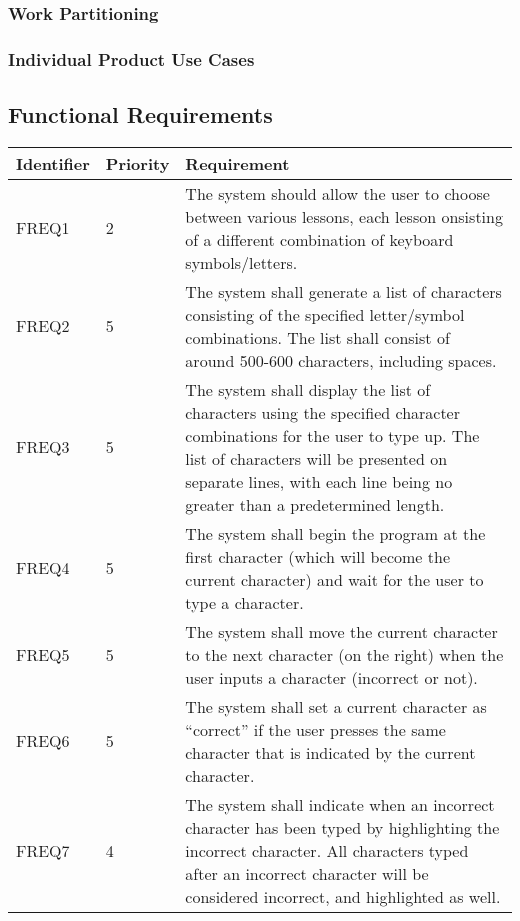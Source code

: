 \documentclass[12pt, titlepage]{article}
\begin{document}
\subsubsection{Work Partitioning}

\subsubsection{Individual Product Use Cases}

\subsection{Functional Requirements}



\begin{center}
\begin{longtable}{ |m{2cm}|m{1.8cm}|m{9.4cm}| } 
    \hline
    \textbf{Identifier} & \textbf{Priority} & \textbf{Requirement} \\ 
    \hline
    FREQ1 & 2 & The system should allow the user to choose between various lessons, each lesson onsisting of a different combination of keyboard symbols/letters. \\ 
    \hline
    FREQ2 & 5 & The system shall generate a list of characters consisting of the specified letter/symbol combinations. The list shall consist of around 500-600 characters, including spaces. \\ 
    \hline
    FREQ3 & 5 & The system shall display the list of characters using the specified character combinations for the user to type up. The list of characters will be presented on separate lines, with each line being no greater than a predetermined length.  \\ 
    \hline
    FREQ4 & 5 & The system shall begin the program at the first character (which will become the current character) and wait for the user to type a character. \\ 
    \hline
    FREQ5 & 5 & The system shall move the current character to the next character (on the right) when the user inputs a character (incorrect or not).  \\ 
    \hline
    FREQ6 & 5 & The system shall set a current character as “correct” if the user presses the same character that is indicated by the current character. \\ 
    \hline
    FREQ7 & 4 & The system shall indicate when an incorrect character has been typed by highlighting the incorrect character. All characters typed after an incorrect character will be considered incorrect, and highlighted as well. \\ 

\end{longtable}
\end{center}
\end{document}

